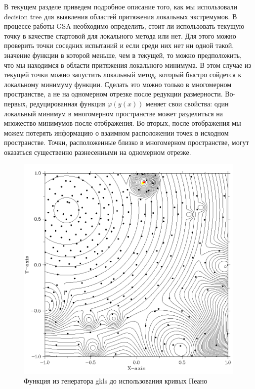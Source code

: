 \documentclass{svproc}
\begin{document}
В текущем разделе приведем подробное описание того, как мы использовали decision tree для выявления областей притяжения локальных экстремумов. 
В процессе работы GSA необходимо определить, стоит ли использовать текущую точку в качестве стартовой для локального метода или нет. Для этого можно проверить точки соседних испытаний и если среди них нет ни одной такой, значение функции в которой меньше, чем в текущей, то можно предположить, что мы находимся в области притяжения локального минимума. В этом случае из текущей точки можно запустить локальный метод, который быстро сойдется к локальному минимуму функции. 
Сделать это можно только в многомерном пространстве, а не на одномерном отрезке после редукции размерности.  
Во-первых, редуцированная функция $\varphi(y(x))$ меняет свои свойства: один локальный минимум в многомерном пространстве может разделиться на множество минимумов после отображения. Во-вторых, после отображения мы можем потерять информацию о взаимном расположении точек в исходном пространстве. Точки, расположенные близко в многомерном пространстве, могут оказаться существенно разнесенными на одномерном отрезке.


\begin{figure}[ht!]
	\begin{center}
		\begin{minipage}[h]{0.8\linewidth}
			\includegraphics[width=1\linewidth]{figure/fig2.png}
			\caption{Функция из генератора gkls до использования кривых Пеано} %
			\label{fig:fig2}
		\end{minipage}
	\end{center}
\end{figure}	
\end{document}
